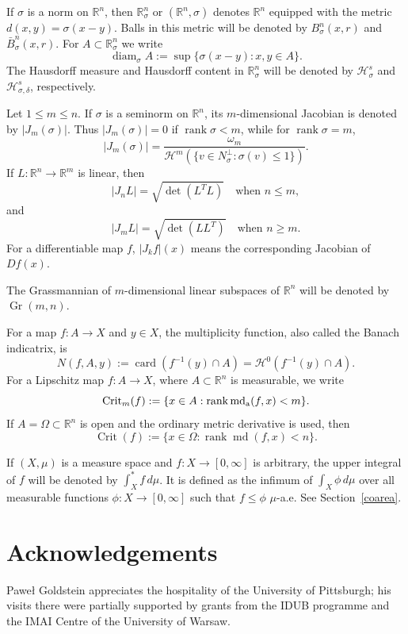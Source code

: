 \documentclass[12pt,leqno]{amsart}
\theoremstyle{definition}
\newcommand{\bbbr}{\mathbb R}
\def\md{\operatorname{md}}
\def\apmd{\operatorname{md_{\rm a}}}
\numberwithin{theorem}{section} \numberwithin{equation}{section}
\begin{document}
If $\sigma$ is a norm on $\mathbb R^n$, then $\mathbb R^n_\sigma$ or
$(\mathbb R^n,\sigma)$ denotes $\mathbb R^n$ equipped with the metric
$d(x,y)=\sigma(x-y)$. Balls in this metric will be denoted by
$B^n_\sigma(x,r)$ and $\bar{B}^n_\sigma(x,r)$. For
$A\subset\mathbb R^n_\sigma$ we write
\[
        \operatorname{diam}_\sigma A
        :=\sup\{\sigma(x-y):x,y\in A\}.
\]
The Hausdorff measure and Hausdorff content in $\mathbb R^n_\sigma$ will be
denoted by $\mathcal H^s_\sigma$ and $\mathcal H^s_{\sigma,\delta}$,
respectively.

Let $1\leq m\leq n$. If $\sigma$ is a seminorm on $\mathbb R^n$, its
$m$-dimensional Jacobian is denoted by $|J_m(\sigma)|$. Thus
$|J_m(\sigma)|=0$ if $\operatorname{rank}\sigma<m$, while for
$\operatorname{rank}\sigma=m$,
\[
        |J_m(\sigma)|
        =
        \frac{\omega_m}
        {\mathcal H^m(\{v\in N_\sigma^\perp:\sigma(v)\leq 1\})}.
\]
If $L:\mathbb R^n\to\mathbb R^m$ is linear, then
\[
        |J_n L|=\sqrt{\det(L^T L)} \quad \text{when } n\leq m,
\]
and
\[
        |J_m L|=\sqrt{\det(LL^T)} \quad \text{when } n\geq m.
\]
For a differentiable map $f$, $|J_k f|(x)$ means the corresponding Jacobian of
$Df(x)$.

The Grassmannian of $m$-dimensional linear subspaces of $\mathbb R^n$ will be
denoted by $\operatorname{Gr}(m,n)$.

For a map $f:A\to X$ and $y\in X$, the multiplicity function, also called the
Banach indicatrix, is
\[
        N(f,A,y):=\operatorname{card}(f^{-1}(y)\cap A)
        =\mathcal H^0(f^{-1}(y)\cap A).
\]
For a Lipschitz map $f:A\to X$, where $A\subset\mathbb R^n$ is measurable, we
write
\[
        \operatorname{Crit}_m(f)
        :=
        \{x\in A:\operatorname{rank} \apmd(f,x)<m\}.
\]
If $A=\Omega\subset\bbbr^n$ is open and the ordinary metric derivative is used, then
\[
        \operatorname{Crit}(f)
        :=
        \{x\in\Omega:\operatorname{rank} \md(f,x)<n\}.
\]

If $(X,\mu)$ is a measure space and $f:X\to[0,\infty]$ is arbitrary, the upper
integral of $f$ will be denoted by
$\int_X^* f\,d\mu$.
It is defined as the infimum of $\int_X \phi\,d\mu$ over all measurable functions
$\phi:X\to[0,\infty]$ such that $f\leq \phi$ $\mu$-a.e. See Section~\ref{coarea}.

\section*{Acknowledgements}
Paweł Goldstein appreciates the hospitality of the University of Pittsburgh; his visits there were partially supported by grants from the IDUB programme and the IMAI Centre of the University of Warsaw.
\end{document}
